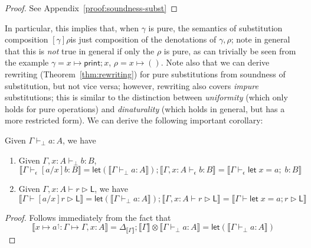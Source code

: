 \documentclass[acmsmall,screen,review]{acmart}
\newcommand{\ms}[1]{\ensuremath{\mathsf{#1}}}
\newcommand{\letexpr}[3]{\ensuremath{\ms{let}\;#1 = #2;\;#3}}
\newcommand{\letstmt}[3]{\ensuremath{\ms{let}\;#1 = #2; #3}}
\newcommand{\lupg}[1]{{#1}^\upharpoonleft}
\newcommand{\bhyp}[2]{#1 : #2}
\newcommand{\hasty}[4]{#1 \vdash_{#2} #3: {#4}}
\newcommand{\haslb}[3]{#1 \vdash #2 \rhd #3}
\newcommand{\issubst}[3]{#1: #2 \mapsto #3}
\newcommand{\dnt}[1]{\llbracket{#1}\rrbracket}
\newcommand{\lmor}[1]{\ms{let}(#1)}
\begin{document}
\begin{proof}
  See Appendix~\ref{proof:soundness-subst}
\end{proof}
In particular, this implies that, when $\gamma$ is pure, the semantics of substitution composition
$[\gamma]\rho$is just composition of the denotations of $\gamma, \rho$; note in general that this is
\emph{not} true in general if only the $\rho$ is pure, as can trivially be seen from the example
\(\gamma = x \mapsto \ms{print}; x\), \(\rho = x \mapsto ()\). Note also that we can derive
rewriting (Theorem~\ref{thm:rewriting}) for pure substitutions from soundness of substitution, but
not vice versa; however, rewriting also covers \emph{impure} substitutions; this is similar to the
distinction between \emph{uniformity} (which only holds for pure operations) and \emph{dinaturality}
(which holds in general, but has a more restricted form). We can derive the following important
corollary:
\begin{corollary}
  Given $\hasty{\Gamma}{\bot}{a}{A}$, we have
  \begin{enumerate}
    \item Given $\hasty{\Gamma, \bhyp{x}{A}}{\bot}{b}{B}$,
    \begin{equation}
      \dnt{\hasty{\Gamma}{\epsilon}{[a/x]b}{B}}
      = \lmor{\dnt{\hasty{\Gamma}{\bot}{a}{A}}} 
        ; \dnt{\hasty{\Gamma, \bhyp{x}{A}}{\epsilon}{b}{B}}
      = \dnt{\hasty{\Gamma}{\epsilon}{\letexpr{x}{a}{b}}{B}}
    \end{equation}
    \item Given $\haslb{\Gamma, \bhyp{x}{A}}{r}{\ms{L}}$, we have
    \begin{equation}
      \dnt{\haslb{\Gamma}{[a/x]r}{\ms{L}}}
      = \lmor{\dnt{\hasty{\Gamma}{\bot}{a}{A}}}
        ; \dnt{\haslb{\Gamma, \bhyp{x}{A}}{r}{\ms{L}}}
      = \dnt{\haslb{\Gamma}{\letstmt{x}{a}{r}}{\ms{L}}}
    \end{equation}
  \end{enumerate}
  \label{corr:single-subst}
\end{corollary}
\begin{proof}
  Follows immediately from the fact that 
  \begin{equation}
    \dnt{\issubst{\lupg{x \mapsto a}}{\Gamma}{\Gamma, \bhyp{x}{A}}} 
    = \Delta_{\dnt{\Gamma}} ; \dnt{\Gamma} \otimes \dnt{\hasty{\Gamma}{\bot}{a}{A}}
    = \lmor{\dnt{\hasty{\Gamma}{\bot}{a}{A}}}
  \end{equation}
\end{proof}
\end{document}
